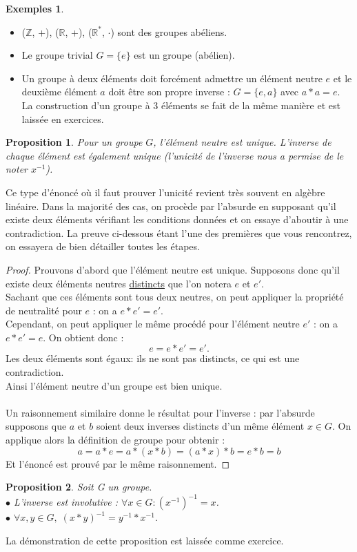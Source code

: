 \documentclass[oneside,12pt,french,table]{book}
\newtheorem{prop}{Proposition}[section]
\theoremstyle{definition}
\theoremstyle{definition}
\newtheorem*{examples}{Exemples}
\theoremstyle{definition}
\begin{document}
\begin{examples}
\hspace{1em}
\begin{itemize}
    \item ($\mathbb{Z}$, +), ($\mathbb{R}$, +), ($\mathbb{R}^*$, $\cdot$) sont des groupes abéliens.
    \item Le groupe trivial $G = \{e\}$ est un groupe (abélien).
    \item Un groupe à deux éléments doit forcément admettre un élément neutre $e$ et le deuxième élément $a$ doit être son propre inverse : $G = \{e,a\}$ avec $a*a = e$. \\
    La construction d'un groupe à 3 éléments se fait de la même manière et est laissée en exercices.
\end{itemize}
\end{examples}
\begin{prop}
Pour un groupe $G$, l'élément neutre est unique. L'inverse de chaque élément est également unique (l'unicité de l'inverse nous a permise de le noter $x^{-1}$).
\end{prop}
\noindent
Ce type d'énoncé où il faut prouver l'unicité revient très souvent en algèbre linéaire. Dans la majorité des cas, on procède par l'absurde en supposant qu'il existe deux éléments vérifiant les conditions données et on essaye d'aboutir à une contradiction. La preuve ci-dessous étant l'une des premières que vous rencontrez, on essayera de bien détailler toutes les étapes.
\begin{proof}
Prouvons d'abord que l'élément neutre est unique. Supposons donc qu'il existe deux éléments neutres \underline{distincts} que l'on notera $e$ et $e'$. \\
Sachant que ces éléments sont tous deux neutres, on peut appliquer la propriété de neutralité pour $e$ : on a $e * e' = e'$. \\
Cependant, on peut appliquer le même procédé pour l'élément neutre $e'$ : on a $e * e' = e$. On obtient donc : 
\[e = e * e' = e'.\]
Les deux éléments sont égaux: ils ne sont pas distincts, ce qui est une contradiction. \\
Ainsi l'élément neutre d'un groupe est bien unique. \\ \\
Un raisonnement similaire donne le résultat pour l'inverse : par l'absurde supposons que $a$ et $b$ soient deux inverses distincts d'un même élément $x \in G$. On applique alors la définition de groupe pour obtenir :
\[a = a * e = a * (x * b) = (a * x) * b = e * b = b\]
Et l'énoncé est prouvé par le même raisonnement.
\end{proof}
\begin{prop}
Soit G un groupe. \\
    $\bullet$ L'inverse est involutive : $\forall x \in G : (x^{-1})^{-1} = x$. \\
    $\bullet$ $\forall x,y \in G, \; (x * y)^{-1} = y^{-1} * x^{-1}$.
\end{prop}
\noindent
La démonstration de cette proposition est laissée comme exercice.
\end{document}
